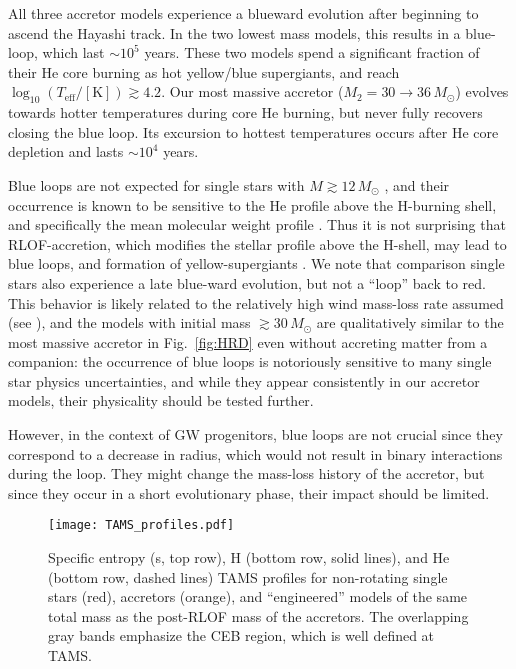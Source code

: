 \documentclass[twocolumn,twocolappendix,trackchanges]{aastex63}
\DeclareRobustCommand{\Figref}[1]{Fig.~\ref{#1}}
\begin{document}
All three accretor models experience a blueward evolution after
beginning to ascend the Hayashi track. In the two lowest mass models,
this results in a blue-loop, which last $\sim{}10^5$ years. These two
models spend a significant fraction of their He core burning as hot
yellow/blue supergiants, and reach
$\log_{10}(T_\mathrm{eff}/\mathrm{[K]})\gtrsim 4.2$. Our most massive
  accretor ($M_2=30\rightarrow 36\,M_\odot$) evolves towards hotter temperatures
  during core He burning, but never fully recovers closing the blue
  loop. Its excursion to hottest temperatures occurs after He core
  depletion and lasts $\sim{}10^{4}$ years.

Blue loops are not expected for single stars with
$M\gtrsim 12\,M_\odot$ \citep[e.g.,][]{walmswell:2015}, and their
occurrence is known to be sensitive to the He profile above the
H-burning shell, and specifically the mean molecular weight profile
\citep{walmswell:2015, farrell:22}. Thus it is not surprising that
RLOF-accretion, which modifies the stellar profile above the H-shell,
may lead to blue loops, and formation of yellow-supergiants
\citep[e.g.,][]{dorn-wallenstein:20}. We note that comparison single
stars also experience a late blue-ward evolution, but not a ``loop''
back to red. This behavior is likely related to the relatively high
wind mass-loss rate assumed (see \citealt{renzo:2017}), and the models
with initial mass $\gtrsim 30\,M_\odot$ are qualitatively similar to
the most massive accretor in \Figref{fig:HRD} even without accreting
matter from a companion: the occurrence of blue loops is notoriously
sensitive to many single star physics uncertainties, and while they
appear consistently in our accretor models, their physicality should
be tested further.

However, in the context of GW progenitors, blue loops are not crucial
since they correspond to a decrease in radius, which would not result
in binary interactions during the loop. They might change the
mass-loss history of the accretor, but since they occur in a short
evolutionary phase, their impact should be
limited. %

\begin{figure*}[htbp]
  \centering
  \texttt{[image: TAMS\_profiles.pdf]}
  \caption{Specific entropy (s, top row), H (bottom row, solid lines),
    and He (bottom row, dashed lines) TAMS profiles for non-rotating
    single stars (red), accretors (orange), and ``engineered'' models
    of the same total mass as the post-RLOF mass of the accretors. The
    overlapping gray bands emphasize the CEB region, which is well
    defined at TAMS.}
  \label{fig:TAMS_profiles}
\end{figure*}
\end{document}
